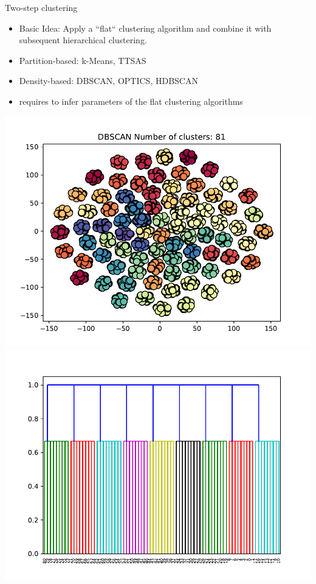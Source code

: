 \documentclass[rgb]{beamer}
\begin{document}
        \begin{frame}{Two-step clustering}
            \begin{itemize}
                \item  Basic Idea: Apply a ``flat`` clustering algorithm and combine it with subsequent hierarchical clustering. \\
                \item Partition-based: k-Means, TTSAS~\cite{macqueen1967some, THEODORIDIS2009627}
                \item Density-based: DBSCAN, OPTICS, HDBSCAN~\cite{dbscan, optics, mcinnes2017hdbscan}
                \item requires to infer parameters of the flat clustering algorithms
            \end{itemize}
           
            \centering\includegraphics[keepaspectratio,width=\textwidth, height=0.5\textheight]{img/dbscan/synth_noise_0_clusters.pdf}  \hspace{1.5cm}
            \includegraphics[keepaspectratio,width=\textwidth, height=0.5\textheight]{img/dbscan/synth_noise_0_dendro.pdf}
        \end{frame}
    
\end{document}
